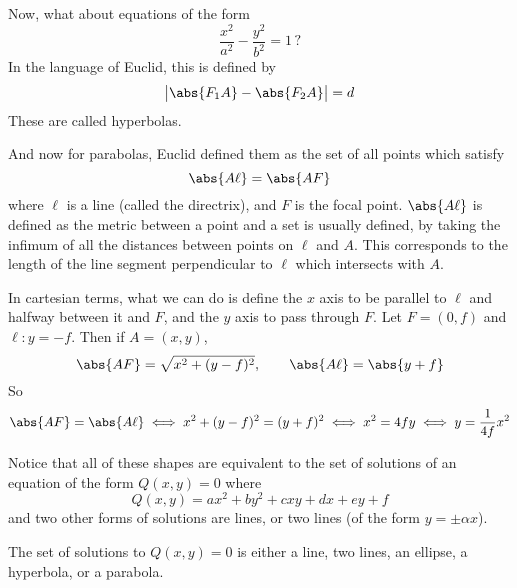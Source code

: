 Now, what about equations of the form
\[ \frac{x^2}{a^2} - \frac{y^2}{b^2} = 1\,? \]
In the language of Euclid, this is defined by
\[ \bigl\lvert\abs{F_1A} - \abs{F_2A}\bigr\rvert = d \]
These are called hyperbolas.

And now for parabolas, Euclid defined them as the set of all points which satisfy
\[ \abs{A\ell} = \abs{AF} \]
where $\ell$ is a line (called the directrix), and $F$ is the focal point.
$\abs{A\ell}$ is defined as the metric between a point and a set is usually defined, by taking the infimum of all the distances between points on $\ell$ and $A$.
This corresponds to the length of the line segment perpendicular to $\ell$ which intersects with $A$.

In cartesian terms, what we can do is define the $x$ axis to be parallel to $\ell$ and halfway between it and $F$, and the $y$ axis to pass through $F$.
Let $F=(0,f)$ and $\ell\colon y=-f$.
Then if $A=(x,y)$,
\[ \abs{AF} = \sqrt{x^2+(y-f)^2},\qquad \abs{A\ell} = \abs{y+f} \]
So
\[ \abs{AF} = \abs{A\ell} \iff x^2+(y-f)^2 = (y+f)^2 \iff x^2 = 4fy \iff y = \frac1{4f}x^2 \]

Notice that all of these shapes are equivalent to the set of solutions of an equation of the form $Q(x,y)=0$ where
\[ Q(x,y) = ax^2 + by^2 + cxy + dx + ey + f \]
and two other forms of solutions are lines, or two lines (of the form $y=\pm\alpha x$).

\begin{prop*}

    The set of solutions to $Q(x,y)=0$ is either a line, two lines, an ellipse, a hyperbola, or a parabola.

\end{prop*}

